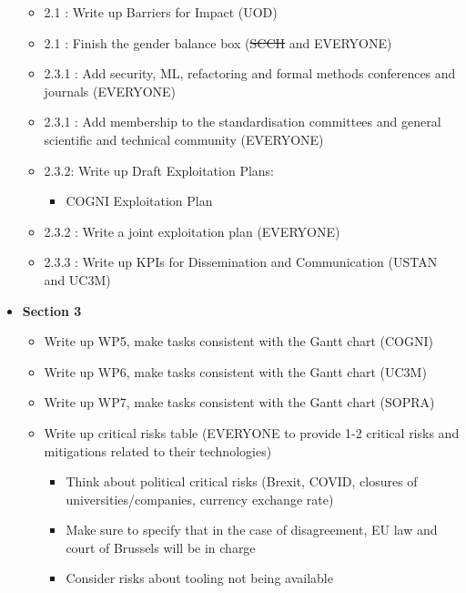 \documentclass[a4paper,11pt]{article}
\begin{document}
\begin{itemize}
\begin{itemize}
\item 2.1 : Write up Barriers for Impact (UOD)

\item 2.1 : Finish the gender balance box (\sout{SCCH} and EVERYONE)

\item 2.3.1 : Add security, ML, refactoring and formal methods conferences and journals (EVERYONE)

\item 2.3.1 : Add membership to the standardisation committees and general scientific and technical community (EVERYONE)

\item 2.3.2: Write up Draft Exploitation Plans:
\begin{itemize}
\item COGNI Exploitation Plan
\end{itemize}

\item 2.3.2 : Write a joint exploitation plan (EVERYONE)

\item 2.3.3 : Write up KPIs for Dissemination and Communication (USTAN and UC3M)
\end{itemize}

\item \textbf{Section 3}

\begin{itemize}
\item Write up WP5, make tasks consistent with the Gantt chart (COGNI)

\item Write up WP6, make tasks consistent with the Gantt chart (UC3M)

\item Write up WP7, make tasks consistent with the Gantt chart (SOPRA)

\item Write up critical risks table (EVERYONE to provide 1-2 critical risks and mitigations related to their technologies)
\begin{itemize}
\item Think about political critical risks (Brexit, COVID, closures of universities/companies, currency exchange rate)
\item Make sure to specify that in the case of disagreement, EU law and court of Brussels will be in charge
\item Consider risks about tooling not being available
\end{itemize}


\end{itemize}
\end{itemize}
\end{document}
